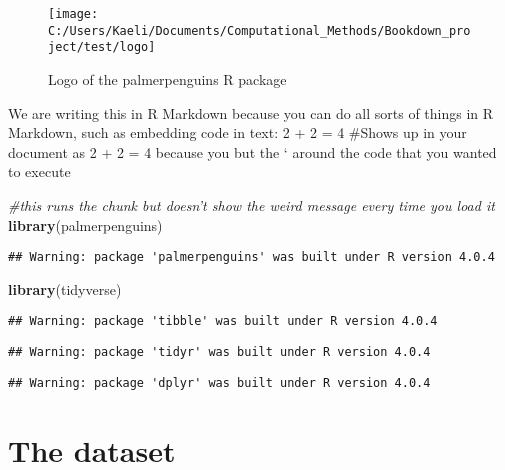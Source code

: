 \documentclass[
]{book}
\newenvironment{Shaded}{\begin{snugshade}}{\end{snugshade}}
\newcommand{\CommentTok}[1]{\textcolor[rgb]{0.56,0.35,0.01}{\textit{#1}}}
\newcommand{\KeywordTok}[1]{\textcolor[rgb]{0.13,0.29,0.53}{\textbf{#1}}}
\newcommand{\NormalTok}[1]{#1}
\begin{document}
\begin{figure}

{\centering \texttt{[image: C:/Users/Kaeli/Documents/Computational\_Methods/Bookdown\_project/test/logo]} 

}

\caption{Logo of the palmerpenguins R package}\label{fig:logo}
\end{figure}

We are writing this in R Markdown because you can do all sorts of things in
R Markdown, such as embedding code in text: 2 + 2 = 4
\#Shows up in your document as 2 + 2 = 4 because you but the ` around the code that you wanted to execute

\begin{Shaded}
\begin{Highlighting}[]
\CommentTok{#this runs the chunk but doesn't show the weird message every time you load it}
\KeywordTok{library}\NormalTok{(palmerpenguins)}
\end{Highlighting}
\end{Shaded}

\begin{verbatim}
## Warning: package 'palmerpenguins' was built under R version 4.0.4
\end{verbatim}

\begin{Shaded}
\begin{Highlighting}[]
\KeywordTok{library}\NormalTok{(tidyverse)}
\end{Highlighting}
\end{Shaded}

\begin{verbatim}
## Warning: package 'tibble' was built under R version 4.0.4
\end{verbatim}

\begin{verbatim}
## Warning: package 'tidyr' was built under R version 4.0.4
\end{verbatim}

\begin{verbatim}
## Warning: package 'dplyr' was built under R version 4.0.4
\end{verbatim}

\hypertarget{the-dataset}{%
\section{The dataset}\label{the-dataset}}
\end{document}
